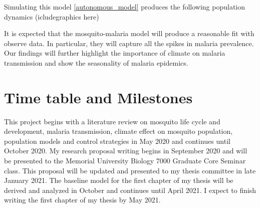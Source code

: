 \documentclass[12pt,a4paper,titlepage]{article}
\begin{document}
Simulating this model \ref{autonomous_model} produces the following population dynamics (icludegraphics here)


It is expected that the mosquito-malaria model will produce a reasonable fit with observe data. In particular, they will capture all the spikes in malaria prevalence. Our findings will further highlight the importance of climate on malaria transmission and show the seasonality of malaria epidemics. 



\section{Time table and Milestones}
This project begins with a literature review on mosquito life cycle and development, malaria transmission, climate effect on mosquito population, population models and control strategies in May 2020 and continues until October 2020. My research proposal writing begins in September 2020 and will be presented to the Memorial University Biology 7000 Graduate Core Seminar class. This proposal will be updated and presented to my thesis committee in  late January 2021. The baseline model for the first chapter of my thesis will be derived and analyzed in October and continues until April 2021. I expect to finish writing the first chapter of my thesis by May 2021. 






\end{document}

